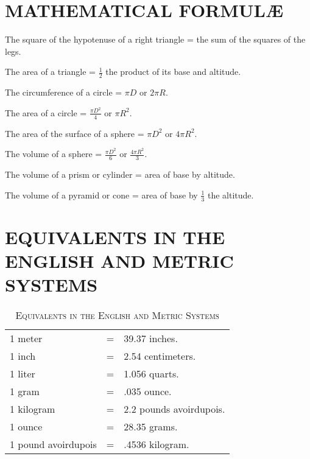 \documentclass[11pt]{article}
\begin{document}
\section*{MATHEMATICAL FORMUL\AE}

The square of the hypotenuse of a right triangle = the sum of the squares of the legs.

The area of a triangle = $\frac{1}{2}$ the product of its base and altitude.

The circumference of a circle = $\pi D$ or $2\pi R$.

The area of a circle = $\frac{\pi D^2}{4}$ or $\pi R^2$.

The area of the surface of a sphere = $\pi D^2$ or $4 \pi R^2$.

The volume of a sphere = $\frac{\pi D^2}{6}$ or $\frac{4 \pi R^2}{3}$.

The volume of a prism or cylinder = area of base by altitude.

The volume of a pyramid or cone = area of base by $\frac{1}{3}$ the altitude.

\section*{EQUIVALENTS IN THE ENGLISH AND METRIC SYSTEMS}

\begin{center}

\begin{table}[h!]
 
    \caption{\textsc{Equivalents in the English and Metric Systems}}
    \bgroup
    \def\arraystretch{1}%
        \begin{tabular}{lcl}
            1 meter & = & 39.37 inches. \\
            1 inch & = & 2.54 centimeters. \\
            1 liter & = & 1.056 quarts. \\
            1 gram & = & .035 ounce. \\
            1 kilogram & = & 2.2 pounds avoirdupois. \\
            1 ounce & = & 28.35 grams. \\
            1 pound avoirdupois & = & .4536 kilogram. \\
        \end{tabular}
    \egroup

\end{table}
 
\end{center}
\end{document}
